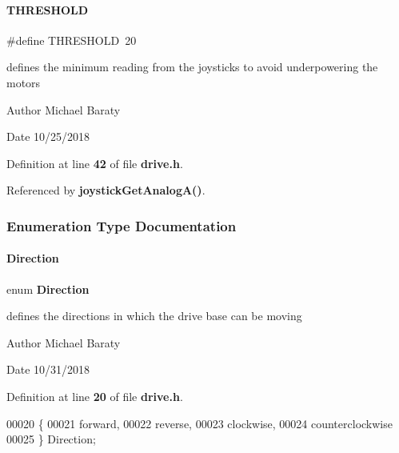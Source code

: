 \paragraph{T\+H\+R\+E\+S\+H\+O\+LD}
{\footnotesize\ttfamily \#define T\+H\+R\+E\+S\+H\+O\+LD~20}



defines the minimum reading from the joysticks to avoid underpowering the motors 

\begin{DoxyAuthor}{Author}
Michael Baraty 
\end{DoxyAuthor}
\begin{DoxyDate}{Date}
10/25/2018 
\end{DoxyDate}


Definition at line \textbf{ 42} of file \textbf{ drive.\+h}.



Referenced by \textbf{ joystick\+Get\+Analog\+A()}.



\subsubsection{Enumeration Type Documentation}
\mbox{\label{drive_8h_a224b9163917ac32fc95a60d8c1eec3aa}} 
\paragraph{Direction}
{\footnotesize\ttfamily enum \textbf{ Direction}}



defines the directions in which the drive base can be moving 

\begin{DoxyAuthor}{Author}
Michael Baraty 
\end{DoxyAuthor}
\begin{DoxyDate}{Date}
10/31/2018 
\end{DoxyDate}


Definition at line \textbf{ 20} of file \textbf{ drive.\+h}.


\begin{DoxyCode}
00020              \{
00021   forward,
00022   reverse,
00023   clockwise,
00024   counterclockwise
00025 \} Direction;
\end{DoxyCode}
\mbox{\label{drive_8h_a2f0911ee5d810257dbf1bdb35da96fbc}} 
